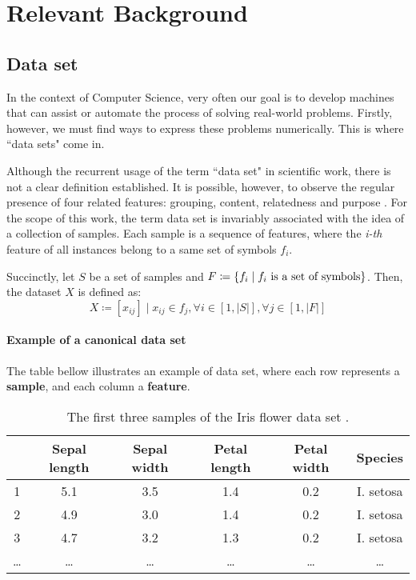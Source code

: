 \chapter{Relevant Background}
\section{Data set}

In the context of Computer Science, very often our goal is to develop machines that can assist or automate the process of solving real-world problems. Firstly, however, we must find ways to express these problems numerically. This is where ``data sets" come in.

Although the recurrent usage of the term ``data set" in scientific work, there is not a clear definition established. It is possible, however, to observe the regular presence of four related features: grouping, content, relatedness and purpose \cite{ren2010}.
For the scope of this work, the term data set is invariably associated with the idea of a collection of samples. Each sample is a sequence of features, where the {\em i-th} feature of all instances belong to a same set of symbols $f_i$.

Succinctly, let $S$ be a set of samples and $F \coloneqq  \{f_i \mid f_i \textnormal{ is a set of symbols}\}$. Then, the dataset $X$ is defined as:
$$X\coloneqq [x_{ij}] \mid x_{ij} \in f_j, \forall i \in [1, |S|], \forall j \in [1, |F|]$$

\subsubsection{Example of a canonical data set} \label{irisdataset}

The table bellow illustrates an example of data set, where each row represents a \textbf{sample}, and each column a \textbf{feature}.

\begin{table}[H]
	\begin{tabular}{ c || *{5}{c|}}
		& \textbf{Sepal length} & \textbf{Sepal width} & \textbf{Petal length} & \textbf{Petal width} & \textbf{Species} \\
		\hline
		1 & 5.1	& 3.5 & 1.4 & 0.2 & I. setosa \\
		2 & 4.9 & 3.0 & 1.4 & 0.2 & I. setosa \\
		3 & 4.7 & 3.2 & 1.3 & 0.2 & I. setosa \\
		… & … & … & … & … & … \\
	\end{tabular}
	\caption{The first three samples of the Iris flower data set \protect\footnotemark.}
\end{table}

